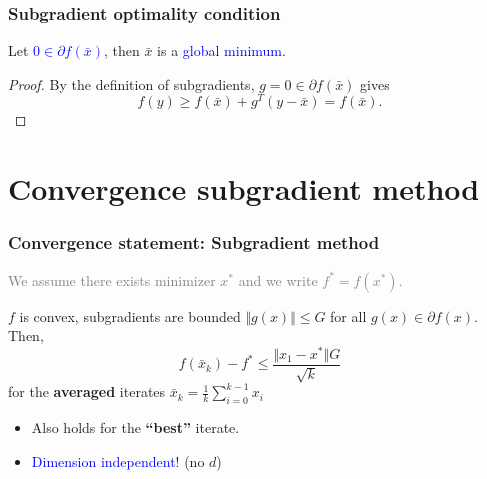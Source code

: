 \documentclass{beamer}
\begin{document}
\begin{frame}
  \frametitle{Subgradient optimality condition}
  \begin{lemma}%
    Let \textcolor{blue}{$0 \in \partial f(\bar{x})$}, then $\bar{x}$ is a \textcolor{blue}{global minimum}.
  \end{lemma}
  \begin{proof}
    By the definition of subgradients, $g=0 \in \partial f(\bar{x})$ gives
    \begin{equation}
      f(y) \ge f(\bar{x}) + g^T(y-\bar{x}) = f(\bar{x}).
    \end{equation}
  \end{proof}
\end{frame}


\section{Convergence subgradient method}%
\label{sec:}

\begin{frame}
  \frametitle{Convergence statement: Subgradient method}
  \textcolor{gray}{We assume there exists minimizer $x^*$ and we write $f^*=f(x^*)$.}
  \begin{theorem}
    $f$ is convex, subgradients are bounded $\Vert g(x) \Vert \le G$ for all $g(x)\in \partial f(x)$. Then,
    \begin{equation}
      f(\bar{x}_k) - f^* \le \frac{\Vert x_1-x^*\Vert G}{\sqrt{k}}
    \end{equation}
    for the \textbf{averaged} iterates $\bar{x}_k = \frac{1}{k} \sum_{i=0}^{k-1} x_i $
  \end{theorem}
  \begin{itemize}
    \item Also holds for the \textbf{``best''} iterate.
    \item \textcolor{blue}{Dimension independent!} (no $d$)
  \end{itemize}
\end{frame}
\end{document}
